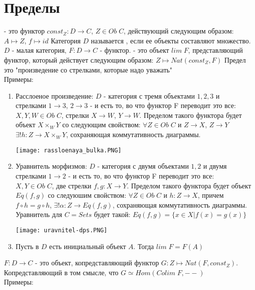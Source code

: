 \documentclass[a4paper]{article}
\theoremstyle{indented}
\theoremstyle{definition}
\theoremstyle{remark}
\DeclareMathOperator{\ra}{\rightarrow}
\begin{document}
\section{Пределы}
 {} - это функтор $const_Z: D \ra C$, $Z \in Ob\;C$, действующий следующим образом: $A \mapsto Z$, $f \mapsto id$
 Категория $D$ называется , если ее объекты составляют множество.
 $D$ - малая категория, $F: D \ra C$ - функтор.  - это объект $lim\;F$, представляющий функтор, который действует следующим образом: $Z \mapsto Nat(const_Z, F)$
\remark Предел это "произведение со стрелками, которые надо уважать" \\
Примеры:
\begin{enumerate}
    \item Расслоеное произведение: $D$ - категория с тремя объектами $1, 2, 3$ и стрелками $1 \ra 3$, $2 \ra 3$ - и есть то, во что функтор F переводит это все: $X, Y, W \in Ob\;C$, стрелки $X \ra W$, $Y \ra W$. Пределом такого функтора будет объект $X \times_W Y$ со следующим свойством: $\forall Z \in Ob\;C$ и $Z \ra X$, $Z \ra Y$ $\exists !h: Z \ra X \times_W Y$, сохраняющая коммутативность диаграммы.
    \begin{center}\texttt{[image: rassloenaya\_bulka.PNG]}\end{center}
    \item Уравнитель морфизмов: $D$ - категория с двумя объектами $1, 2$ и двумя стрелками $1 \ra 2$ - и есть то, во что функтор F переводит это все: $X, Y \in Ob\;C$, две стрелки $f, g: X \ra Y$. Пределом такого функтора будет объект $Eq(f, g)$ со следуюшим свойством: $\forall Z \in Ob\;C$ и $h: Z \ra X$, причем $f \circ h = g \circ h$, $\exists !\alpha: Z \ra Eq(f, g)$, сохраняющая коммутативность диаграммы. \\
    Уравнитель для $C = Sets$ будет такой: $Eq(f, g) = \{x \in X | f(x) = g(x)\}$
    \begin{center}\texttt{[image: uravnitel-dps.PNG]}\end{center}
    \item Пусть в $D$ есть инициальный объект $A$. Тогда $lim\;F = F(A)$
\end{enumerate}
 {} $F: D \ra C$ - это объект, копредставляющий функтор $G: Z \mapsto Nat(F, const_Z)$. Копредставляющий в том смысле, что $G \simeq Hom(Colim\;F, --)$ \\
Примеры:
\end{document}
